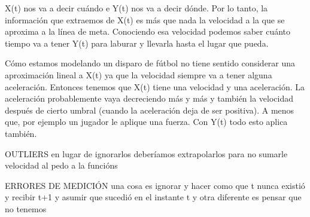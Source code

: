 X(t) nos va a decir cuándo e Y(t) nos va a decir dónde. Por lo tanto, la información que extraemos de X(t) es más que nada 
la velocidad a la que se aproxima a la línea de meta. Conociendo esa velocidad podemos saber cuánto tiempo va a tener Y(t) para laburar
y llevarla hasta el lugar que pueda. 

Cómo estamos modelando un disparo de fútbol no tiene sentido considerar una aproximación lineal a X(t) ya que la velocidad siempre va 
a tener alguna aceleración. Entonces tenemos que X(t) tiene una velocidad y una aceleración. La aceleración probablemente vaya decreciendo
más y más y también la velocidad después de cierto umbral (cuando la aceleración deja de ser positiva). A menos que, por ejemplo un 
jugador le aplique una fuerza. Con Y(t) todo esto aplica también.


OUTLIERS
en lugar de ignorarlos deberíamos extrapolarlos para no sumarle velocidad al pedo a la funcións

ERRORES DE MEDICIÓN
una cosa es ignorar y hacer como que t nunca existió y recibir t+1 y asumir que sucedió en el instante t y otra diferente es pensar que no
tenemos 